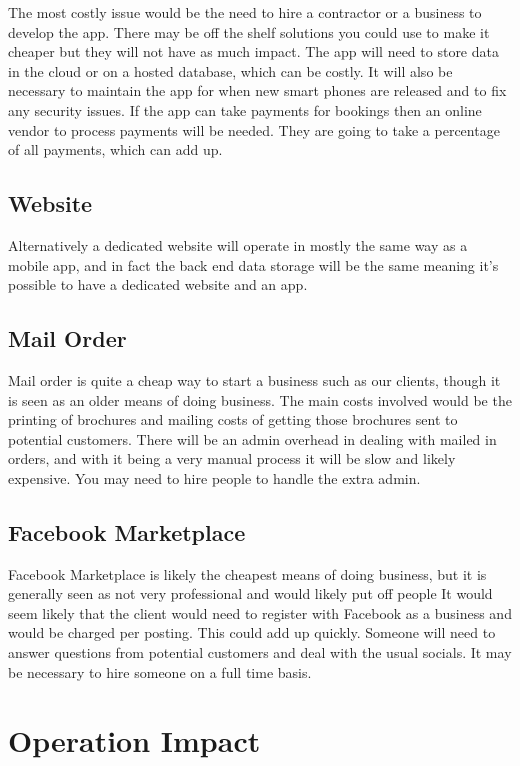 \documentclass{article}
\begin{document}
The most costly issue would be the need to hire a contractor or a business to develop the app. There may be off the shelf solutions you could use to make it cheaper but they will not have as much impact.
The app will need to store data in the cloud or on a hosted database, which can be costly.
It will also be necessary to maintain the app for when new smart phones are released and to fix any security issues.
If the app can take payments for bookings then an online vendor to process payments will be needed. They are going to take a percentage of all payments, which can add up.

\subsection{Website}
Alternatively a dedicated website will operate in mostly the same way as a mobile app, and in fact the back end data storage will be the same meaning it's possible to have a dedicated website and an app.


\subsection{Mail Order}

Mail order is quite a cheap way to start a business such as our clients, though it is seen as an older means of doing business.
The main costs involved would be the printing of brochures and mailing costs of getting those brochures sent to potential customers.
There will be an admin overhead in dealing with mailed in orders, and with it being a very manual process it will be slow and likely expensive. You may need to hire people to handle the extra admin.


\subsection{Facebook Marketplace}

Facebook Marketplace is likely the cheapest means of doing business, but it is generally seen as not very professional and would likely put off people
It would seem likely that the client would need to register with Facebook as a business and would be charged per posting. This could add up quickly.
Someone will need to answer questions from potential customers and deal with the usual socials. It may be necessary to hire someone on a full time basis.

\pagebreak
\section{Operation Impact}
\end{document}

